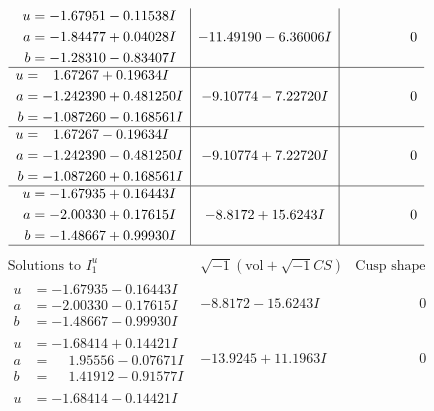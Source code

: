 \documentclass[1p]{elsarticle_modified}
\theoremstyle{definition}
\newcommand{\I}{\sqrt{-1}}
\begin{document}
$$\begin{array}{c|c|c}
\begin{aligned}
u &= -1.67951 - 0.11538 I \\
a &= -1.84477 + 0.04028 I \\
b &= -1.28310 - 0.83407 I\end{aligned}
 & -11.49190 - 6.36006 I & \phantom{-0.000000 } 0 \\ \hline\begin{aligned}
u &= \phantom{-}1.67267 + 0.19634 I \\
a &= -1.242390 + 0.481250 I \\
b &= -1.087260 - 0.168561 I\end{aligned}
 & -9.10774 - 7.22720 I & \phantom{-0.000000 } 0 \\ \hline\begin{aligned}
u &= \phantom{-}1.67267 - 0.19634 I \\
a &= -1.242390 - 0.481250 I \\
b &= -1.087260 + 0.168561 I\end{aligned}
 & -9.10774 + 7.22720 I & \phantom{-0.000000 } 0 \\ \hline\begin{aligned}
u &= -1.67935 + 0.16443 I \\
a &= -2.00330 + 0.17615 I \\
b &= -1.48667 + 0.99930 I\end{aligned}
 & -8.8172 + 15.6243 I & \phantom{-0.000000 } 0\\
 \hline 
 \end{array}$$\newpage$$\begin{array}{c|c|c}  
\text{Solutions to }I^u_{1}& \I (\text{vol} + \sqrt{-1}CS) & \text{Cusp shape}\\
 \hline 
\begin{aligned}
u &= -1.67935 - 0.16443 I \\
a &= -2.00330 - 0.17615 I \\
b &= -1.48667 - 0.99930 I\end{aligned}
 & -8.8172 - 15.6243 I & \phantom{-0.000000 } 0 \\ \hline\begin{aligned}
u &= -1.68414 + 0.14421 I \\
a &= \phantom{-}1.95556 - 0.07671 I \\
b &= \phantom{-}1.41912 - 0.91577 I\end{aligned}
 & -13.9245 + 11.1963 I & \phantom{-0.000000 } 0 \\ \hline\begin{aligned}
u &= -1.68414 - 0.14421 I \\

\end{aligned}
\end{array}$$
\end{document}
